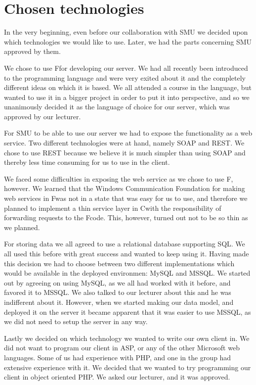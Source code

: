 \section{Chosen technologies}
In the very beginning, even before our collaboration with SMU we decided upon which technologies we would like to use. Later, we had the parts concerning SMU approved by them.

We chose to use F\Sh for developing our server. We had all recently been introduced to the programming language and were very exited about it and the completely different ideas on which it is based. We all attended a course in the language, but wanted to use it in a bigger project in order to put it into perspective, and so we unanimously decided it as the language of choice for our server, which was approved by our lecturer.

For SMU to be able to use our server we had to expose the functionality as a web service. Two different technologies were at hand, namely SOAP and REST. We chose to use REST because we believe it is much simpler than using SOAP and thereby less time consuming for us to use in the client.

We faced some difficulties in exposing the web service as we chose to use F\Sh, however. We learned that the Windows Communication Foundation for making web services in F\Sh was not in a state that was easy for us to use, and therefore we planned to implement a thin service layer in C\Sh with the responsibility of forwarding requests to the F\Sh code. This, however, turned out not to be so thin as we planned.

For storing data we all agreed to use a relational database supporting SQL. We all used this before with great success and wanted to keep using it.
Having made this decision we had to choose between two different implementations which would be available in the deployed environmen: MySQL and MSSQL. We started out by agreeing on using MySQL, as we all had worked with it before, and favored it to MSSQL. We also talked to our lecturer about this and he was indifferent about it. However, when we started making our data model, and deployed it on the server it became apparent that it was easier to use MSSQL, as we did not need to setup the server in any way.

Lastly we decided on which technology we wanted to write our own client in. We did not want to program our client in ASP, or any of the other Microsoft web languages. Some of us had experience with PHP, and one in the group had extensive experience with it. We decided that we wanted to try programming our client in object oriented PHP. We asked our lecturer, and it was approved.
\newpage